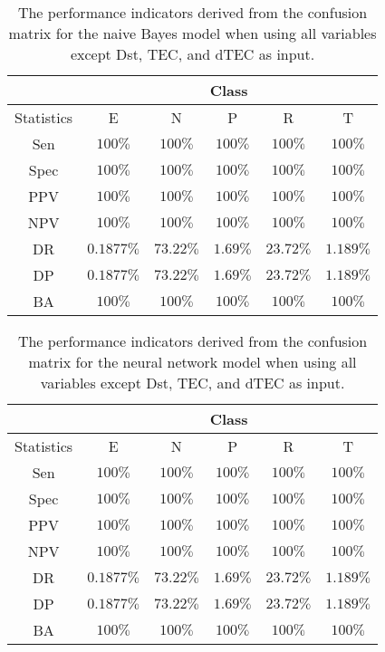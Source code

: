 \begin{table}[!ht]
	\centering
	\begin{tabular}{|c|c|c|c|c|c|}
		\hline
		 & \multicolumn{5}{c|}{Class} \\ \hline
		Statistics & E & N & P & R & T \\ \hline
		Sen & $100\%$ & $100\%$ & $100\%$ & $100\%$ & $100\%$ \\ \hline
		Spec & $100\%$ & $100\%$ & $100\%$ & $100\%$ & $100\%$ \\ \hline
		PPV & $100\%$ & $100\%$ & $100\%$ & $100\%$ & $100\%$ \\ \hline
		NPV & $100\%$ & $100\%$ & $100\%$ & $100\%$ & $100\%$ \\ \hline
		DR & $0.1877\%$ & $73.22\%$ & $1.69\%$ & $23.72\%$ & $1.189\%$ \\ \hline
		DP & $0.1877\%$ & $73.22\%$ & $1.69\%$ & $23.72\%$ & $1.189\%$ \\ \hline
		BA & $100\%$ & $100\%$ & $100\%$ & $100\%$ & $100\%$ \\ \hline
	\end{tabular}
	\caption{The performance indicators derived from the confusion matrix for the naive Bayes model when using all variables except Dst, TEC, and dTEC as input.}
	\label{tab:cs:reverse:noTEC:nb}
\end{table}

\begin{table}[!ht]
	\centering
	\begin{tabular}{|c|c|c|c|c|c|}
		\hline
		 & \multicolumn{5}{c|}{Class} \\ \hline
		Statistics & E & N & P & R & T \\ \hline
		Sen & $100\%$ & $100\%$ & $100\%$ & $100\%$ & $100\%$ \\ \hline
		Spec & $100\%$ & $100\%$ & $100\%$ & $100\%$ & $100\%$ \\ \hline
		PPV & $100\%$ & $100\%$ & $100\%$ & $100\%$ & $100\%$ \\ \hline
		NPV & $100\%$ & $100\%$ & $100\%$ & $100\%$ & $100\%$ \\ \hline
		DR & $0.1877\%$ & $73.22\%$ & $1.69\%$ & $23.72\%$ & $1.189\%$ \\ \hline
		DP & $0.1877\%$ & $73.22\%$ & $1.69\%$ & $23.72\%$ & $1.189\%$ \\ \hline
		BA & $100\%$ & $100\%$ & $100\%$ & $100\%$ & $100\%$ \\ \hline
	\end{tabular}
	\caption{The performance indicators derived from the confusion matrix for the neural network model when using all variables except Dst, TEC, and dTEC as input.}
	\label{tab:cs:reverse:noTEC:nnet}
\end{table}

